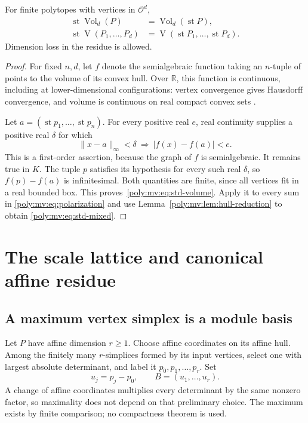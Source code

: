 \documentclass[11pt,a4paper]{article}
\numberwithin{equation}{section}
\theoremstyle{plain}
\newcommand{\R}{\mathbb R}
\newcommand{\st}{\operatorname{st}}
\newcommand{\OO}{\mathcal O}
\newcommand{\Vol}{\operatorname{Vol}}
\newcommand{\MV}{\operatorname{V}}
\begin{document}
\begin{proposition}
\label{poly:mv:prop:volume-reduction}
For finite polytopes with vertices in $\OO^d$,
\begin{align}
 \st\Vol_d(P)&=\Vol_d(\st P),\label{poly:mv:eq:std-volume}\\
 \st\MV(P_1,\ldots,P_d)&=\MV(\st P_1,\ldots,\st P_d).
 \label{poly:mv:eq:std-mixed}
\end{align}
Dimension loss in the residue is allowed.
\end{proposition}
\begin{proof}
For fixed $n,d$, let $f$ denote the semialgebraic function taking an
$n$-tuple of points to the volume of its convex hull. Over $\R$, this
function is continuous, including at lower-dimensional configurations:
vertex convergence gives Hausdorff convergence, and volume is continuous
on real compact convex sets \cite{mv:Schneider}.

Let $a=(\st p_1,\ldots,\st p_n)$. For every positive real $e$, real
continuity supplies a positive real $\delta$ for which
\[
 \|x-a\|_\infty<\delta\ \Longrightarrow\ |f(x)-f(a)|<e.
\]
This is a first-order assertion, because the graph of $f$ is
semialgebraic. It remains true in $K$. The tuple $p$ satisfies its
hypothesis for every such real $\delta$, so $f(p)-f(a)$ is infinitesimal.
Both quantities are finite, since all vertices fit in a real bounded box.
This proves~\eqref{poly:mv:eq:std-volume}. Apply it to every sum in
\eqref{poly:mv:eq:polarization} and use Lemma~\ref{poly:mv:lem:hull-reduction} to obtain
\eqref{poly:mv:eq:std-mixed}.
\end{proof}

\section{The scale lattice and canonical affine residue}
\label{poly:mv:sec:residue}

\subsection{A maximum vertex simplex is a module basis}
Let $P$ have affine dimension $r\ge1$. Choose affine coordinates on its
affine hull. Among the finitely many $r$-simplices formed by its input
vertices, select one with largest absolute determinant, and label it
$p_0,p_1,\ldots,p_r$. Set
\[
 u_j=p_j-p_0,\qquad B=(u_1,\ldots,u_r).
\]
A change of affine coordinates multiplies every determinant by the same
nonzero factor, so maximality does not depend on that preliminary choice.
The maximum exists by finite comparison; no compactness theorem is used.
\end{document}
